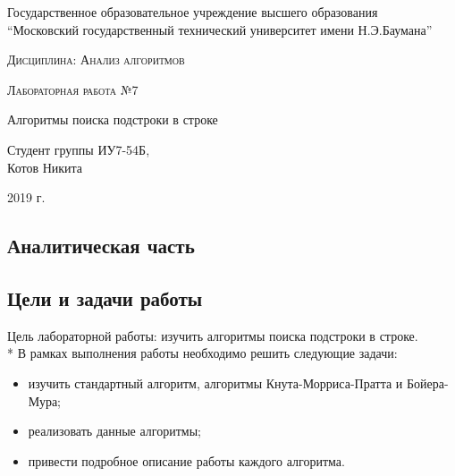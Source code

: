\documentclass[a4paper,12pt]{article}
\begin{document}
    \begin{titlepage}
        \begin{center}
            \large
            Государственное образовательное учреждение высшего  образования\\
            “Московский государственный технический университет имени Н.Э.Баумана”
            \vspace{3cm}
            
            \textsc{Дисциплина: Анализ алгоритмов}
            \vspace{0.5cm}
                
            \textsc{Лабораторная работа №7}
            \vspace{3cm}
            
            {\LARGE Алгоритмы поиска подстроки в строке}
            \vspace{3cm}
            
            Студент группы ИУ7-54Б,\\   
            Котов Никита
            \vfill
            
            2019 г.            
            \end{center}
    \end{titlepage}
    
    \begin{center}
    	\tableofcontents
    \end{center}
	
	\setcounter{page}{2}
	\newpage   

    \begin{center}
        \section{Аналитическая часть}
        \subsection{Цели и задачи работы}
    \end{center}
    
		Цель лабораторной работы: изучить алгоритмы поиска подстроки в строке. \\*
В рамках выполнения работы необходимо решить следующие задачи:
		\begin{itemize}
			\item изучить стандартный алгоритм, алгоритмы Кнута-Морриса-Пратта и Бойера-Мура;
			\item реализовать данные алгоритмы;
			\item привести подробное описание работы каждого алгоритма.
		\end{itemize}
    
\end{document}
